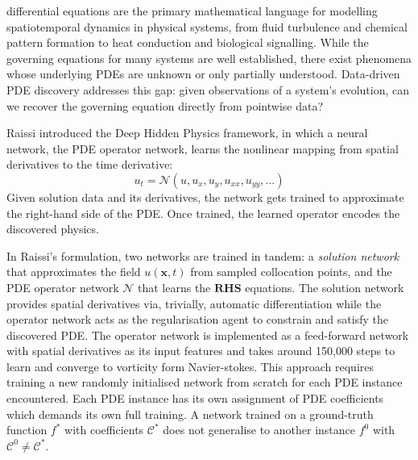 \documentclass[10pt,journal,compsoc]{IEEEtran}
\begin{document}
% 
% 
 differential equations are the primary mathematical
language for modelling spatiotemporal dynamics in physical systems, from fluid
turbulence and chemical pattern formation to heat conduction and
biological signalling. While the governing equations for many systems are well
established, there exist phenomena whose underlying PDEs are unknown or only
partially understood. Data-driven PDE discovery addresses this gap: given
observations of a system's evolution, can we recover the governing equation
directly from pointwise data?

Raissi \cite{raissi2018} introduced the Deep Hidden Physics framework, in which
a neural network, the PDE operator network, learns the nonlinear mapping
from spatial derivatives to the time derivative:
%
\begin{equation}
u_t = \mathcal{N}(u, u_x, u_y, u_{xx}, u_{yy}, ...)
\label{eq:pde_discovery}
\end{equation}
%
Given solution data and its derivatives, the network gets trained to approximate
the right-hand side of the PDE. Once trained, the learned operator encodes the
discovered physics.

In Raissi's formulation, two networks are trained in tandem: a \emph{solution
network} that approximates the field $u(\mathbf{x}, t)$ from sampled
collocation points, and the PDE operator network $\mathcal{N}$ that learns the
$\mathbf{RHS}$ equations. The solution network provides spatial derivatives
via, trivially, automatic differentiation while the operator network acts as
the regularisation agent to constrain and satisfy the discovered PDE. The
operator network is implemented as a feed-forward network with spatial
derivatives as its input features and takes around 150,000 steps to learn and
converge to vorticity form Navier-stokes. This approach requires training a new
randomly initialised network from scratch for each PDE instance encountered.
Each PDE instance has its own assignment of PDE coefficients which demands its
own full training. A network trained on a ground-truth function $f^*$ with
coefficients $\mathcal{C}^*$ does not generalise to another instance $f^0$ with
$\mathcal{C}^0 \neq \mathcal{C}^*$.
 
\end{document}
